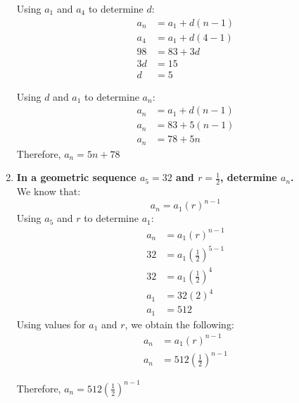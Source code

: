 \documentclass[12pt]{article}
\begin{document}
\begin{enumerate}
    Using $a_1$ and $a_4$ to determine $d$:
    \begin{align*}
        a_n & = a_1 + d(n-1) \\
        a_4 & = a_1 + d(4 - 1) \\
        98 & = 83 + 3d \\
        3d & = 15 \\
        d & = 5
    \end{align*}
    
    Using $d$ and $a_1$ to determine $a_n$:
    \begin{align*}
        a_n & = a_1 + d(n-1) \\
        a_n & = 83 + 5(n-1) \\
        a_n & = 78 + 5n
    \end{align*} 
    Therefore, $a_n = 5n + 78$
    
    \newpage
    
    \item \textbf{In a geometric sequence $a_5 = 32$ and $r = \frac{1}{2}$, determine $a_n$.} \\
    
    We know that: 
    \begin{equation*}
        a_n = a_1(r)^{n - 1}
    \end{equation*}
    Using $a_5$ and $r$ to determine $a_1$:
    \begin{align*}
        a_n & = a_1 (r)^{n - 1} \\
        32 & = a_1(\frac{1}{2})^{5 - 1} \\
        32 & = a_1(\frac{1}{2})^4 \\
        a_1 & = 32 (2)^4 \\
        a_1 & = 512
    \end{align*}
    Using values for $a_1$ and $r$, we obtain the following:
    \begin{align*}
        a_n & = a_1(r)^{n - 1} \\
        a_n & = 512(\frac{1}{2})^{n - 1}
    \end{align*}
    
    Therefore, $a_n = 512(\frac{1}{2})^{n - 1}$
\end{enumerate}
\end{document}
